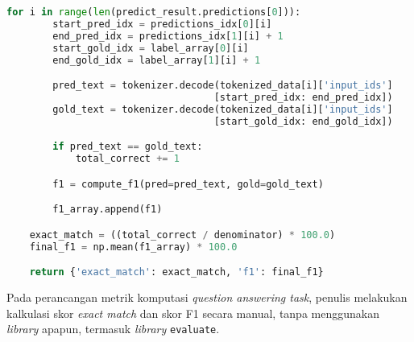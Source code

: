 \begin{lstlisting}[language=Python, caption=Perancangan metrik komputasi untuk penilaian \emph{question answering task}]
    for i in range(len(predict_result.predictions[0])):
        start_pred_idx = predictions_idx[0][i]
        end_pred_idx = predictions_idx[1][i] + 1
        start_gold_idx = label_array[0][i]
        end_gold_idx = label_array[1][i] + 1

        pred_text = tokenizer.decode(tokenized_data[i]['input_ids']
                                    [start_pred_idx: end_pred_idx])
        gold_text = tokenizer.decode(tokenized_data[i]['input_ids']
                                    [start_gold_idx: end_gold_idx])

        if pred_text == gold_text:
            total_correct += 1

        f1 = compute_f1(pred=pred_text, gold=gold_text)

        f1_array.append(f1)

    exact_match = ((total_correct / denominator) * 100.0)
    final_f1 = np.mean(f1_array) * 100.0

    return {'exact_match': exact_match, 'f1': final_f1}
\end{lstlisting}

Pada perancangan metrik komputasi \emph{question answering task}, penulis melakukan kalkulasi skor \emph{exact match} dan skor F1 secara manual, tanpa menggunakan \emph{library} apapun, termasuk \emph{library} \texttt{evaluate}.

